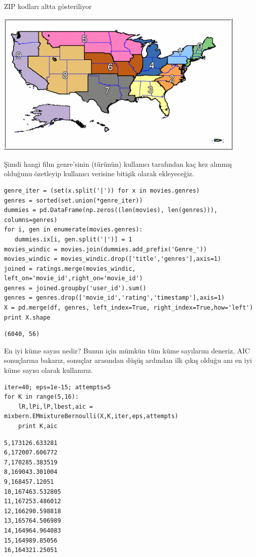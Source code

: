 \documentclass[12pt,fleqn]{article}\usepackage{../../common}
\begin{document}
ZIP kodları altta gösteriliyor

\includegraphics[height=7cm]{zip_code_zones.png}

Şimdi hangi film genre'sinin (türünün) kullanıcı tarafından kaç kez alınmış
olduğunu özetleyip kullanıcı verisine bitişik olarak ekleyeceğiz. 

\begin{verbatim}
genre_iter = (set(x.split('|')) for x in movies.genres)
genres = sorted(set.union(*genre_iter))
dummies = pd.DataFrame(np.zeros((len(movies), len(genres))), columns=genres)
for i, gen in enumerate(movies.genres):
   dummies.ix[i, gen.split('|')] = 1
movies_windic = movies.join(dummies.add_prefix('Genre_'))
movies_windic = movies_windic.drop(['title','genres'],axis=1)
joined = ratings.merge(movies_windic, left_on='movie_id',right_on='movie_id')
genres = joined.groupby('user_id').sum()
genres = genres.drop(['movie_id','rating','timestamp'],axis=1)
X = pd.merge(df, genres, left_index=True, right_index=True,how='left')
print X.shape
\end{verbatim}

\begin{verbatim}
(6040, 56)
\end{verbatim}

En iyi küme sayısı nedir? Bunun için mümkün tüm küme sayılarını deneriz,
AIC sonuçlarına bakarız, sonuçlar arasından düşüş ardından ilk çıkış olduğu
anı en iyi küme sayısı olarak kullanırız. 

\begin{verbatim}
iter=40; eps=1e-15; attempts=5
for K in range(5,16):
    lR,lPi,lP,lbest,aic = mixbern.EMmixtureBernoulli(X,K,iter,eps,attempts)
    print K,aic
\end{verbatim}

\begin{verbatim}
5,173126.633281
6,172007.606772
7,170285.383519
8,169043.301004
9,168457.12051
10,167463.532805
11,167253.486012
12,166290.598818
13,165764.506989
14,164964.964083
15,164989.85056
16,164321.25051
\end{verbatim}
\end{document}
